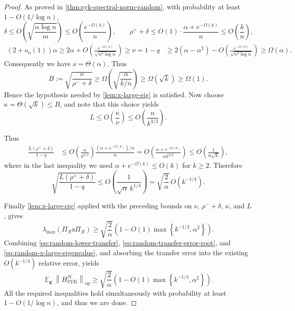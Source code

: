 \documentclass
[11pt,letterpaper]
{article}
\theoremstyle{definition}
\newcommand{\sfx}{\mathsf x}
\newcommand{\1}{\mathbf{1}}
\newcommand{\cH}{\mathcal H}
\DeclareMathOperator*{\E}{\mathbb{E}}
\newcommand{\cR}{\mathcal R}
\renewcommand{\geq}{\geqslant}
\renewcommand{\leq}{\leqslant}
\begin{document}
\begin{proof}
As proved in \cref{thm:syk-spectral-norm-random}, with probability at
least $1-O(1/\log n)$,
\[\delta\leq O\left(\sqrt{\frac{\alpha\log n}{m}}\right)\leq O\left(\frac{e^{-\Omega(k)}}{n}\right),\qquad \rho^++\delta\leq O(1)\cdot\frac{\alpha+e^{-\Omega(k)}}{n}\leq O\left(\frac{k}{n}\right),\]
\begin{align*}
(2 + o_n(1))\alpha\geq 2\alpha + O\!\left(
\frac{e^{-\Omega(k)}}{\sqrt{n^3\log n}}
\right)\geq\nu = 1-q
&\geq
2(\alpha-\alpha^2)
-
O\!\left(
\frac{e^{-\Omega(k)}}{\sqrt{n^3\log n}}
\right)
\geq \Omega(\alpha).
\end{align*}
Consequently we have $\nu = \Theta(\alpha)$. Thus
\[
B
:=
\sqrt{\frac{\nu}{\rho^- + \delta}}
 \geq
\Omega\!\left(
\sqrt{\frac{\alpha}{k/n}}
\right)
\geq
\Omega(\sqrt{k})
\geq\Omega(1).
\]
Hence the hypothesis needed by \cref{lem:x-large-eig} is satisfied. Now choose $\kappa = \Theta(\sqrt{k})\leq B$, and note that this choice yields 
\[L\leq O\left(\frac{\kappa}{\nu}\right)\leq O\!\left(\frac{n}{k^{3/2}}\right).\]

Thus
\begin{align*}
\frac{L(\rho^++\delta)}{1-q}
&\leq
O\!\left(\frac{n}{k^{3/2}}\right)
\frac{(\alpha+e^{-\Omega(k)})/n}{\alpha}
 =
O\!\left(
\frac{\alpha+e^{-\Omega(k)}}{\alpha k^{3/2}}
\right)
\leq
O\!\left(\frac1{\alpha\sqrt{k}}\right),
\end{align*}
where in the last inequality we used
$\alpha+e^{-\Omega(k)}\leq O(k)$ for $k\geq2$. Therefore
\begin{equation}
\label{eq:random-transfer-error-root}
\sqrt{\frac{L(\rho^++\delta)}{1-q}}\leq O\!\left(\frac1{\sqrt{\alpha}\,k^{1/4}}\right) = \sqrt{\frac2\alpha}\,O\!\left(k^{-1/4}\right).
\end{equation}

Finally \cref{lem:x-large-eig} applied with the preceding bounds on $\nu$, $\rho^-+\delta$, $\kappa$, and $L$, gives
\begin{equation}
\label{eq:random-x-large-eigenvalue}
\lambda_{\max}\!\left(\Pi_\cR\sfx\Pi_\cR\right)\geq\sqrt{\frac2\alpha}\left(1-O(1)\max\left\{k^{-1/2},\alpha^2\right\}\right).
\end{equation}
Combining
\eqref{eq:random-lower-transfer},
\eqref{eq:random-transfer-error-root}, and
\eqref{eq:random-x-large-eigenvalue}, and absorbing the transfer error into
the existing $O(k^{-1/4})$ relative error, yields
\[\E_{\bm g}\left\|H^\cH_{\operatorname{SYK}}\right\|_{\operatorname{op}}\geq\sqrt{\frac2\alpha}\left(1-O(1)\max\left\{k^{-1/4},\alpha^2\right\}\right).\]
All the required inequalities hold simultaneously with probability
at least $1-O(1/\log n)$, and thus we are done.
\end{proof}
\end{document}
